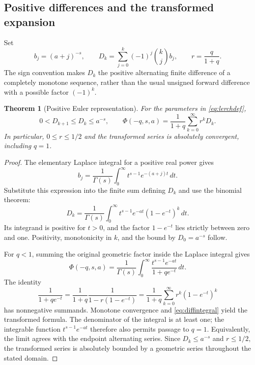 \documentclass[11pt,a4paper]{article}
\newtheorem{theorem}{Theorem}[section]
\begin{document}
\subsection{Positive differences and the transformed expansion}
Set
\begin{equation}
 b_j=(a+j)^{-s},\qquad
 D_k=\sum_{j=0}^{k}(-1)^j\binom{k}{j}b_j,
 \qquad r=\frac{q}{1+q}.
\label{eq:diff}
\end{equation}
The sign convention makes $D_k$ the positive alternating finite difference of a completely monotone sequence, rather than the usual unsigned forward difference with a possible factor $(-1)^k$.

\begin{theorem}[Positive Euler representation]
For the parameters in \eqref{eq:lerchdef},
\begin{equation}
 0<D_{k+1}\le D_k\le a^{-s},
 \qquad
 \Phi(-q,s,a)=\frac1{1+q}\sum_{k=0}^{\infty}r^k D_k.
\label{eq:eulerrep}
\end{equation}
In particular, $0\le r\le1/2$ and the transformed series is absolutely convergent, including $q=1$.
\end{theorem}
\begin{proof}
The elementary Laplace integral for a positive real power gives
\[
 b_j=\frac1{\Gamma(s)}\int_0^\infty t^{s-1}e^{-(a+j)t}\,dt.
\]
Substitute this expression into the finite sum defining $D_k$ and use the binomial theorem:
\begin{equation}
 D_k=\frac1{\Gamma(s)}\int_0^\infty
 t^{s-1}e^{-at}(1-e^{-t})^k\,dt.
\label{eq:diffintegral}
\end{equation}
Its integrand is positive for $t>0$, and the factor $1-e^{-t}$ lies strictly between zero and one. Positivity, monotonicity in $k$, and the bound by $D_0=a^{-s}$ follow.

For $q<1$, summing the original geometric factor inside the Laplace integral gives
\[
 \Phi(-q,s,a)=\frac1{\Gamma(s)}\int_0^\infty
 \frac{t^{s-1}e^{-at}}{1+q e^{-t}}\,dt.
\]
The identity
\[
 \frac1{1+q e^{-t}}
 =\frac1{1+q}\frac1{1-r(1-e^{-t})}
 =\frac1{1+q}\sum_{k=0}^{\infty}r^k(1-e^{-t})^k
\]
has nonnegative summands. Monotone convergence and \eqref{eq:diffintegral} yield the transformed formula. The denominator of the integral is at least one; the integrable function $t^{s-1}e^{-at}$ therefore also permits passage to $q=1$. Equivalently, the limit agrees with the endpoint alternating series. Since $D_k\le a^{-s}$ and $r\le1/2$, the transformed series is absolutely bounded by a geometric series throughout the stated domain.
\end{proof}
\end{document}
